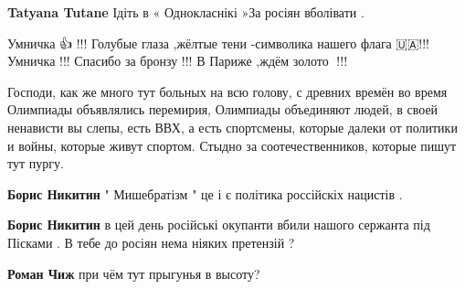 \begin{itemize}
\begin{itemize}
\textbf{Tatyana Tutane} Ідіть в « Однокласнікі »За росіян вболівати .
\end{itemize}

 
Умничка 👍 !!! Голубые глаза ,жёлтые тени -символика нашего флага 🇺🇦!!!
Умничка !!! Спасибо за бронзу !!! В Париже ,ждём золото 🥇!!!

 

Господи, как же много тут больных на всю голову, с древних времён во время
Олимпиады объявлялись перемирия, Олимпиады объединяют людей, в своей ненависти
вы слепы, есть ВВХ, а есть спортсмены, которые далеки от политики и войны,
которые живут спортом. Стыдно за соотечественников, которые пишут тут пургу.

\begin{itemize}
 
\textbf{Борис Никитин} " Мишебратізм " це і є політика россійскіх нацистів .

 
\textbf{Борис Никитин} в цей день російські окупанти вбили нашого сержанта під
Пісками . В тебе до росіян нема ніяких претензій ?

\begin{itemize}
 
\textbf{Роман Чиж} при чём тут прыгунья в высоту?


\end{itemize}
\end{itemize}
\end{itemize}
